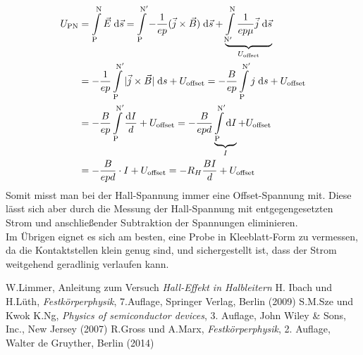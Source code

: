 \documentclass[a4paper,12pt]{article}
\begin{document}
\begin{align}
U_\text{PN}&=\int\limits_{\mathrm{P}}^{\mathrm{N}}\vec{E}\;\mathrm{d}\vec{s}=\int\limits_{\mathrm{P}}^{\mathrm{N}^\prime}-\frac{1}{ep}(\vec{j}\times \vec{B})\;\mathrm{d}\vec{s}+\underbrace{\int\limits_{\mathrm{N}^\prime}^{\mathrm{N}}\frac{1}{ep\mu}\vec{j}\;\mathrm{d}\vec{s}}_{U_\text{offset}}\notag\\
&=-\frac{1}{ep}\int\limits_{\mathrm{P}}^{\mathrm{N}^\prime}|\vec{j}\times\vec{B}|\;\mathrm{d}s+U_\text{offset}=-\frac{B}{ep}\int\limits_{\mathrm{P}}^{\mathrm{N}^\prime}j\;\mathrm{d}s+U_\text{offset}\notag\\
&=-\frac{B}{ep}\int\limits_{\mathrm{P}}^{\mathrm{N}^\prime}\frac{\mathrm{d}I}{d}+U_\text{offset}=-\frac{B}{epd}\underbrace{\int\limits_{\mathrm{P}}^{\mathrm{N}^\prime}\mathrm{d}I}_{I}+U_\text{offset}\notag\\
&=-\frac{B}{epd}\cdot I +U_\text{offset}=-R_H\frac{BI}{d}+U_\text{offset}
\end{align}
Somit misst man bei der Hall-Spannung immer eine Offset-Spannung mit. Diese lässt sich aber durch die Messung der Hall-Spannung mit entgegengesetzten Strom und anschließender Subtraktion der Spannungen eliminieren.\\
Im Übrigen eignet es sich am besten, eine Probe in Kleeblatt-Form zu vermessen, da die Kontaktstellen klein genug sind, und sichergestellt ist, dass der Strom weitgehend geradlinig verlaufen kann.
\begin{thebibliography}{10}
 W.Limmer, Anleitung zum Versuch \emph{Hall-Effekt in Halbleitern}
 H. Ibach und H.Lüth, \emph{Festkörperphysik}, 7.Auflage, Springer Verlag, Berlin (2009)
 S.M.Sze und Kwok K.Ng, \emph{Physics of semiconductor devices}, 3. Auflage, John Wiley \& Sons, Inc., New Jersey (2007)
 R.Gross und A.Marx, \emph{Festkörperphysik}, 2. Auflage, Walter de Gruyther, Berlin (2014)
\end{thebibliography}
\end{document}
